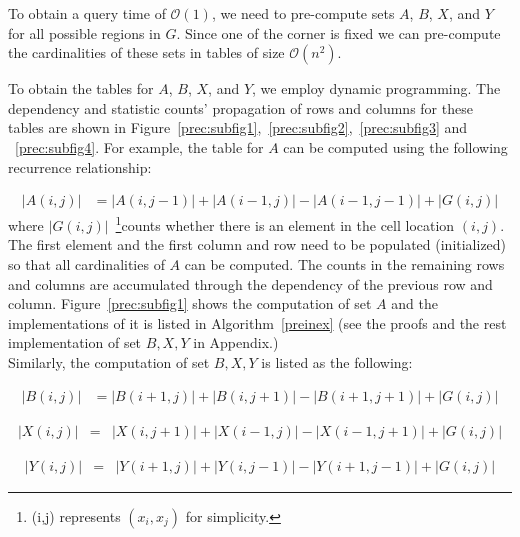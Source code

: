 \documentclass[AMA,LATO1COL]{WileyNJD-v2}
\newcommand\bigo{\mathcal O}
\begin{document}
To obtain a query time of $\bigo(1)$, we need to pre-compute sets $A$, $B$, $X$, and $Y$ for all possible regions in $G$. Since one of the corner is fixed we can pre-compute the cardinalities of these sets in tables of size $\bigo(n^2)$.

To obtain the tables for $A$, $B$, $X$, and $Y$, we employ dynamic programming. The dependency and statistic counts' propagation of rows and columns for these tables are shown in Figure~\ref{prec:subfig1},~\ref{prec:subfig2},~\ref{prec:subfig3} and ~\ref{prec:subfig4}. For example, the table for $A$ can be computed using the following recurrence relationship:


\begin{eqnarray}
|A(i,j)|  &= |A(i,j-1)| + |A(i-1,j)| - |A(i-1,j-1)|  + |G(i,j)|
\end{eqnarray}
\normalsize
where $|G(i,j)|$~\footnote{(i,j) represents $(x_i,x_j)$ for simplicity.}counts whether there is an element in the cell location $(i,j)$. The first element and the first column and row need to be populated (initialized) so that all cardinalities of $A$ can be computed. The counts in the remaining rows and columns are accumulated through the dependency of the previous row and column. Figure~\ref{prec:subfig1} shows the computation of set $A$ and the implementations of it is listed in Algorithm~\ref{preinex} (see the proofs and the rest implementation of set $B,X,Y$ in Appendix.)\\

Similarly, the computation of set $B,X,Y$ is listed as the following:

\begin{eqnarray}
|B(i,j)|  &= |B(i+1,j)| + |B(i,j+1)| - |B(i+1,j+1)| + |G(i,j)|
\end{eqnarray}
\normalsize

\begin{eqnarray}
|X(i,j)|  &= & |X(i,j+1)| + |X(i-1,j)| - |X(i-1,j+1)| + |G(i,j)|
\end{eqnarray}
\normalsize

\begin{eqnarray}
|Y(i,j)|  &= & |Y(i+1,j)| + |Y(i,j-1)| - |Y(i+1,j-1)| + |G(i,j)|
\end{eqnarray}
\normalsize
\end{document}

